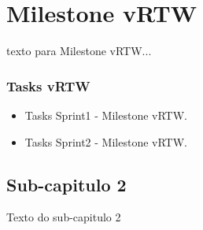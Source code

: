 
\chapter{Milestone vRTW}

texto para Milestone vRTW...


\subsection{Tasks vRTW}

\begin{itemize}
	\item Tasks Sprint1 - Milestone vRTW.
	\item Tasks Sprint2 - Milestone vRTW.
\end{itemize}


\section{Sub-capitulo 2}
Texto do sub-capitulo 2

